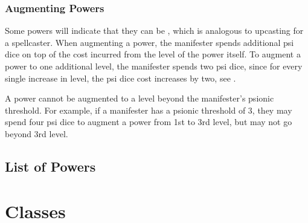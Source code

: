 \subsection{Augmenting Powers}
\label{sub:augmenting}
Some powers will indicate that they can be ,
which is analogous to upcasting for a spellcaster.
When augmenting a power,
the manifester spends additional psi dice on top of the cost
incurred from the level of the power itself.
To augment a power to one additional level,
the manifester spends two psi dice,
since for every single increase in level,
the psi dice cost increases by two,
see . 

A power cannot be augmented to a level beyond the manifester's
psionic threshold.
For example,
if a manifester has a psionic threshold of 3,
they may spend four psi dice to augment a power from
1st to 3rd level,
but may not go beyond 3rd level.

\section{List of Powers}
\label{sec:list_of_powers}


\chapter{Classes}
\label{chap:classes}

